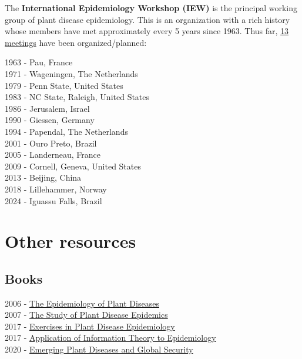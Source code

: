 \documentclass[
  letterpaper,
]{book}
\begin{document}
The \textbf{International Epidemiology Workshop (IEW)} is the principal
working group of plant disease epidemiology. This is an organization
with a rich history whose members have met approximately every 5 years
since 1963. Thus far, \href{https://iew13.net/about.html}{13 meetings}
have been organized/planned:

1963 - Pau, France\\
1971 - Wageningen, The Netherlands\\
1979 - Penn State, United States\\
1983 - NC State, Raleigh, United States\\
1986 - Jerusalem, Israel\\
1990 - Giessen, Germany\\
1994 - Papendal, The Netherlands\\
2001 - Ouro Preto, Brazil\\
2005 - Landerneau, France\\
2009 - Cornell, Geneva, United States\\
2013 - Beijing, China\\
2018 - Lillehammer, Norway\\
2024 - Iguassu Falls, Brazil

\hypertarget{other-resources}{%
\section{Other resources}\label{other-resources}}

\hypertarget{books}{%
\subsection{Books}\label{books}}

2006 - \href{https://link.springer.com/book/10.1007/1-4020-4581-6}{The
Epidemiology of Plant Diseases}\\
2007 -
\href{https://apsjournals.apsnet.org/doi/book/10.1094/9780890545058}{The
Study of Plant Disease Epidemics}\\
2017 -
\href{https://apsjournals.apsnet.org/doi/book/10.1094/9780890544426}{Exercises
in Plant Disease Epidemiology}\\
2017 -
\href{https://apsjournals.apsnet.org/doi/book/10.1094/9780890544877}{Application
of Information Theory to Epidemiology}\\
2020 -
\href{https://apsjournals.apsnet.org/doi/book/10.1094/9780890546383}{Emerging
Plant Diseases and Global Security}\\
\end{document}
